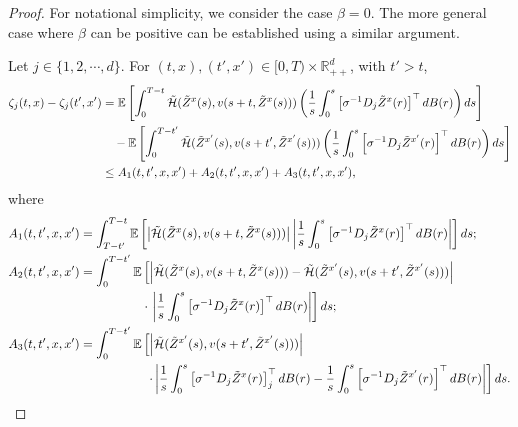 \documentclass[11pt]{article}
\theoremstyle{definition}
\theoremstyle{plain}
\newcommand{\cH}{{\cal H}}
\begin{document}
\begin{appendices}
\begin{proof}
For notational simplicity, we consider the case \( \beta = 0 \).  
The more general case where \( \beta \) can be positive can be established using a similar argument.

Let $j \in \{1, 2, \cdots, d\}$. For \( (t,x), (t',x') \in [0,T) \times \mathbb{R}_{++}^d \), with \( t' > t \),  
\begin{align*}
\zeta_j(t,x) - \zeta_j(t',x') 
&= \mathbb{E} \left[ \int_0^{T - t} \tilde \cH (\tilde{Z}^x(s), v(s + t, \tilde{Z}^x(s))) 
\left( \frac{1}{s} \int_0^s \left[\sigma^{-1} D_j \tilde{Z}^x(r)\right]^{\top} dB(r) \right) ds \right] \\
&\quad - \mathbb{E} \left[ \int_0^{T - t'} \tilde \cH (\tilde{Z}^{x'}(s), v(s + t', \tilde{Z}^{x'}(s))) 
\left( \frac{1}{s} \int_0^s \left[\sigma^{-1} D_j \tilde{Z}^{x'}(r)\right]^{\top} dB(r) \right) ds \right] \\
&\leq A_1(t, t', x, x') + A_2(t, t', x, x') + A_3(t, t', x, x'),
\end{align*}
where
\begin{align}
A_1(t, t', x, x') &= \int_{T - t'}^{T - t} \mathbb{E} \left[ \left|\tilde \cH(\tilde{Z}^x(s), v(s + t, \tilde{Z}^x(s)))\right| 
\left| \frac{1}{s} \int_0^s \left[\sigma^{-1} D_j \tilde{Z}^x(r)\right]^{\top} dB(r) \right| \right] ds; \label{eq:A1}\\
A_2(t, t', x, x') &= \int_0^{T - t'} \mathbb{E} \left[ \left| \tilde\cH(\tilde{Z}^x(s), v(s + t, \tilde{Z}^x(s))) 
- \tilde \cH(\tilde{Z}^{x'}(s), v(s + t', \tilde{Z}^{x'}(s))) \right| \right. \nonumber \\
& \qquad \qquad \quad \cdot \left.\left| \frac{1}{s} \int_0^s \left[\sigma^{-1} D_j \tilde{Z}^x(r)\right]^{\top} dB(r) \right| \right] ds; \label{eq:A2}\\
A_3(t, t', x, x') &= \int_0^{T - t'} \mathbb{E} \left[ \left|\tilde \cH(\tilde{Z}^{x'}(s), v(s + t', \tilde{Z}^{x'}(s)))\right| \right. \nonumber \\ 
&~~~~~~~~~~~~~~~~
 \left. \cdot \left| \frac{1}{s} \int_0^s \left[\sigma^{-1} D_j \tilde{Z}^x(r)\right]^{\top}_j dB(r) - \frac{1}{s} \int_0^s \left[\sigma^{-1} D_j \tilde{Z}^{x'}(r)\right]^{\top} dB(r) \right| \right] ds. \label{eq:A3}
\end{align}


\end{proof}
\end{appendices}
\end{document}
